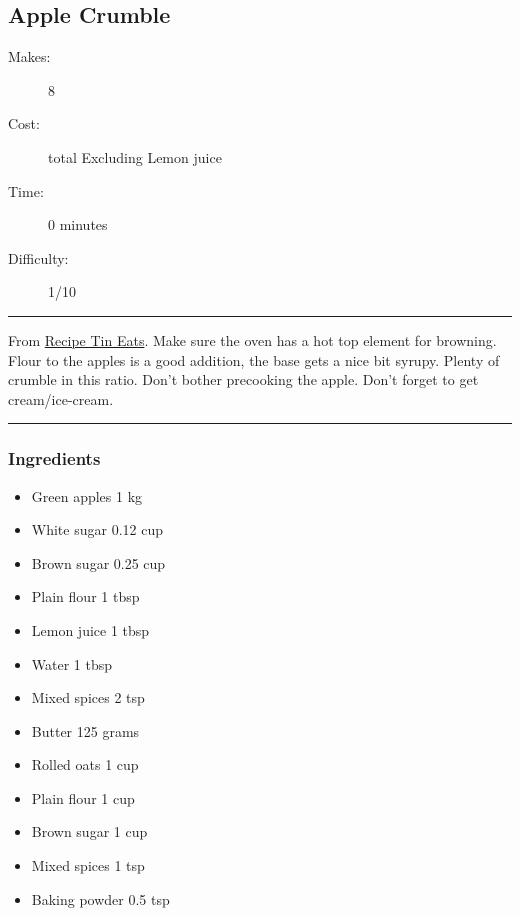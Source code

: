 \documentclass[]{article}
\begin{document}
\subsection*{\center\huge Apple Crumble}
\begin{description}
\item[Makes:] 8 
\item[Cost:]  total Excluding Lemon juice
\item[Time:] 0 minutes
\item[Difficulty:] 1/10
\end{description}
\vspace{0.2cm}\hrule\vspace{0.5cm}
\begin{adjustwidth}{0.5 cm}{0.5 cm}

From \href{https://www.recipetineats.com/apple-crumble/}{Recipe Tin Eats}. Make sure the oven has a hot top element for browning. Flour to the apples is a good addition, the base gets a nice bit syrupy. Plenty of crumble in this ratio. Don’t bother precooking the apple. Don’t forget to get cream/ice-cream. \hfill{}\color{black}

\end{adjustwidth}
\vspace{0.5cm}\hrule
\subsubsection*{\Large Ingredients}
\begin{multicols}{2}
\begin{itemize}
 \item Green apples \hfill 1 kg
 \item White sugar \hfill 0.12 cup
 \item Brown sugar \hfill 0.25 cup
 \item Plain flour \hfill 1 tbsp
 \item Lemon juice \hfill 1 tbsp
 \item Water \hfill 1 tbsp
 \item Mixed spices \hfill 2 tsp
 \item Butter \hfill 125 grams
 \item Rolled oats \hfill 1 cup
 \item Plain flour \hfill 1 cup
 \item Brown sugar \hfill 1 cup
 \item Mixed spices \hfill 1 tsp
 \item Baking powder \hfill 0.5 tsp
\end{itemize}
\end{multicols}
\end{document}
